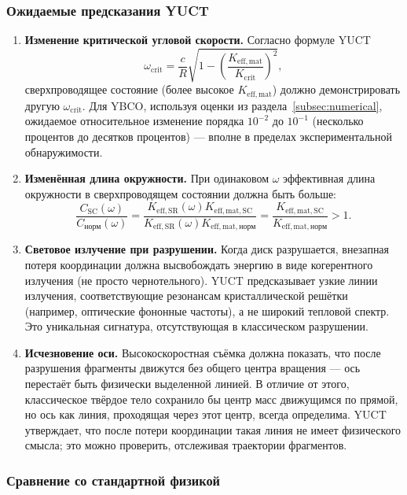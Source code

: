 \documentclass[12pt,a4paper]{article}
\begin{document}
	\subsubsection{Ожидаемые предсказания YUCT}
	
	\begin{enumerate}
		\item \textbf{Изменение критической угловой скорости.} Согласно формуле YUCT
		\[
		\omega_{\text{crit}} = \frac{c}{R}\sqrt{1 - \left(\frac{K_{\mathrm{eff,mat}}}{K_{\mathrm{crit}}}\right)^2},
		\]
		сверхпроводящее состояние (более высокое \(K_{\mathrm{eff,mat}}\)) должно демонстрировать другую \(\omega_{\text{crit}}\). Для YBCO, используя оценки из раздела~\ref{subsec:numerical}, ожидаемое относительное изменение порядка \(10^{-2}\) до \(10^{-1}\) (несколько процентов до десятков процентов) — вполне в пределах экспериментальной обнаружимости.
		
		\item \textbf{Изменённая длина окружности.} При одинаковом \(\omega\) эффективная длина окружности в сверхпроводящем состоянии должна быть больше:
		\[
		\frac{C_{\text{SC}}(\omega)}{C_{\text{норм}}(\omega)} = \frac{K_{\mathrm{eff,SR}}(\omega) K_{\mathrm{eff,mat,SC}}}{K_{\mathrm{eff,SR}}(\omega) K_{\mathrm{eff,mat,норм}}} = \frac{K_{\mathrm{eff,mat,SC}}}{K_{\mathrm{eff,mat,норм}}} > 1.
		\]
		
		\item \textbf{Световое излучение при разрушении.} Когда диск разрушается, внезапная потеря координации должна высвобождать энергию в виде когерентного излучения (не просто чернотельного). YUCT предсказывает узкие линии излучения, соответствующие резонансам кристаллической решётки (например, оптические фононные частоты), а не широкий тепловой спектр. Это уникальная сигнатура, отсутствующая в классическом разрушении.
		
		\item \textbf{Исчезновение оси.} Высокоскоростная съёмка должна показать, что после разрушения фрагменты движутся без общего центра вращения — ось перестаёт быть физически выделенной линией. В отличие от этого, классическое твёрдое тело сохранило бы центр масс движущимся по прямой, но ось как линия, проходящая через этот центр, всегда определима. YUCT утверждает, что после потери координации такая линия не имеет физического смысла; это можно проверить, отслеживая траектории фрагментов.
	\end{enumerate}
	
	\subsubsection{Сравнение со стандартной физикой}
	
\end{document}
